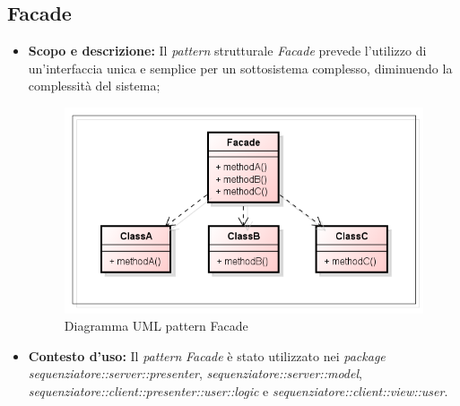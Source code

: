 \subsection{Facade}
\begin{itemize}
\item \textbf{Scopo e descrizione:}
Il \textit{pattern} strutturale \textit{Facade} prevede l'utilizzo di un'interfaccia unica e semplice per un sottosistema complesso, diminuendo la complessità del sistema;
\begin{figure}[H] \centering \includegraphics[scale=1]{./pattern/facade.png} \caption{Diagramma UML pattern Facade}
\end{figure}
\item \textbf{Contesto d'uso:}
Il \textit{pattern} \textit{Facade} è stato utilizzato nei \textit{package sequenziatore::server::presenter}, \textit{sequenziatore::server::model}, \textit{sequenziatore::client::presenter::user::logic} e \textit{sequenziatore::client::view::user}.
\end{itemize}


